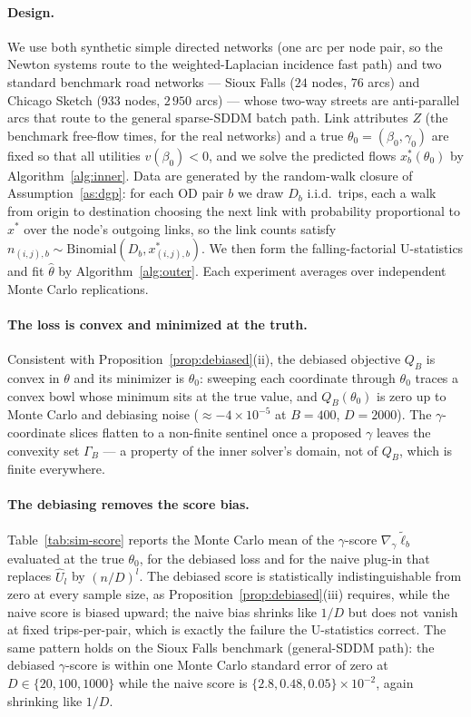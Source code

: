 \documentclass[12pt]{article}
\begin{document}
\paragraph{Design.} We use both synthetic simple directed networks (one arc per
node pair, so the Newton systems route to the weighted-Laplacian incidence fast
path) and two standard benchmark road networks --- Sioux Falls ($24$ nodes, $76$
arcs) and Chicago Sketch ($933$ nodes, $2\,950$ arcs) --- whose two-way streets are
anti-parallel arcs that route to the general sparse-SDDM batch path. Link
attributes $Z$ (the benchmark free-flow times, for the real networks) and a true
$\theta_0 = (\beta_0,\gamma_0)$ are fixed so that all utilities $v(\beta_0)<0$, and
we solve the predicted flows $x^*_b(\theta_0)$ by Algorithm~\ref{alg:inner}. Data
are generated by the random-walk closure of Assumption~\ref{as:dgp}: for each OD
pair $b$ we draw $D_b$ i.i.d.\ trips, each a walk from origin to destination
choosing the next link with probability proportional to $x^*$ over the node's
outgoing links, so the link counts satisfy
$n_{(i,j),b}\sim\mathrm{Binomial}(D_b, x^*_{(i,j),b})$. We then form the
falling-factorial U-statistics and fit $\hat\theta$ by Algorithm~\ref{alg:outer}.
Each experiment averages over independent Monte Carlo replications.

\paragraph{The loss is convex and minimized at the truth.} Consistent with
Proposition~\ref{prop:debiased}(ii), the debiased objective $Q_B$ is convex in
$\theta$ and its minimizer is $\theta_0$: sweeping each coordinate through $\theta_0$
traces a convex bowl whose minimum sits at the true value, and $Q_B(\theta_0)$ is
zero up to Monte Carlo and debiasing noise ($\approx -4\times10^{-5}$ at $B=400$,
$D=2000$). The $\gamma$-coordinate slices flatten to a non-finite sentinel once a
proposed $\gamma$ leaves the convexity set $\Gamma_B$ --- a property of the inner
solver's domain, not of $Q_B$, which is finite everywhere.

\paragraph{The debiasing removes the score bias.} Table~\ref{tab:sim-score} reports
the Monte Carlo mean of the $\gamma$-score $\nabla_\gamma \tilde\ell_b$ evaluated at
the true $\theta_0$, for the debiased loss and for the naive plug-in that replaces
$\hat U_l$ by $(n/D)^l$. The debiased score is statistically indistinguishable from
zero at every sample size, as Proposition~\ref{prop:debiased}(iii) requires, while
the naive score is biased upward; the naive bias shrinks like $1/D$ but does not
vanish at fixed trips-per-pair, which is exactly the failure the U-statistics
correct. The same pattern holds on the Sioux Falls benchmark (general-SDDM path):
the debiased $\gamma$-score is within one Monte Carlo standard error of zero at
$D\in\{20,100,1000\}$ while the naive score is $\{2.8,0.48,0.05\}\times10^{-2}$,
again shrinking like $1/D$.
\end{document}

